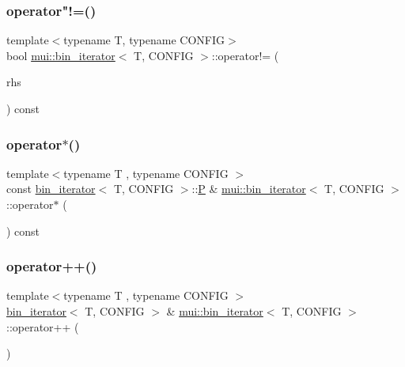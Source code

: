 \subsubsection{\texorpdfstring{operator"!=()}{operator!=()}}
{\footnotesize\ttfamily template$<$typename T, typename C\+O\+N\+F\+IG$>$ \\
bool \hyperlink{structmui_1_1bin__iterator}{mui\+::bin\+\_\+iterator}$<$ T, C\+O\+N\+F\+IG $>$\+::operator!= (\begin{DoxyParamCaption}\item[{const \hyperlink{structmui_1_1bin__iterator}{bin\+\_\+iterator}$<$ T, C\+O\+N\+F\+IG $>$ \&}]{rhs }\end{DoxyParamCaption}) const\hspace{0.3cm}{\ttfamily [inline]}}

\mbox{\label{structmui_1_1bin__iterator_a03e75c57f1b080531ea1da1ad7dc8039}} 
\subsubsection{\texorpdfstring{operator$\ast$()}{operator*()}}
{\footnotesize\ttfamily template$<$typename T , typename C\+O\+N\+F\+IG $>$ \\
const \hyperlink{structmui_1_1bin__iterator}{bin\+\_\+iterator}$<$ T, C\+O\+N\+F\+IG $>$\+::\hyperlink{structmui_1_1bin__iterator_a647b888410c7aec82b750400f5d5c283}{P} \& \hyperlink{structmui_1_1bin__iterator}{mui\+::bin\+\_\+iterator}$<$ T, C\+O\+N\+F\+IG $>$\+::operator$\ast$ (\begin{DoxyParamCaption}{ }\end{DoxyParamCaption}) const\hspace{0.3cm}{\ttfamily [inline]}}

\mbox{\label{structmui_1_1bin__iterator_abcbb2de1b131606af75b303f2d8e90e9}} 
\subsubsection{\texorpdfstring{operator++()}{operator++()}\hspace{0.1cm}{\footnotesize\ttfamily [1/2]}}
{\footnotesize\ttfamily template$<$typename T , typename C\+O\+N\+F\+IG $>$ \\
\hyperlink{structmui_1_1bin__iterator}{bin\+\_\+iterator}$<$ T, C\+O\+N\+F\+IG $>$ \& \hyperlink{structmui_1_1bin__iterator}{mui\+::bin\+\_\+iterator}$<$ T, C\+O\+N\+F\+IG $>$\+::operator++ (\begin{DoxyParamCaption}{ }\end{DoxyParamCaption})\hspace{0.3cm}{\ttfamily [inline]}}

